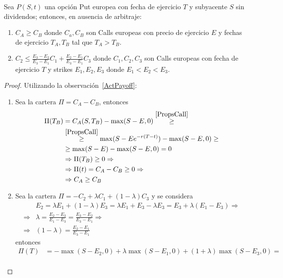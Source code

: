 \begin{proposition}
    Sea $P(S,t)$ una opción Put europea con fecha de ejercicio $T$ y subyacente $S$ sin dividendos; entonces, en ausencia de arbitraje:
    \begin{enumerate}
        \item $\boxed{C_A \geq C_B}$ donde $C_a, C_B$ son Calls europeas con precio de ejercicio $E$ y fechas de ejercicio $T_A, T_B$ tal que $T_A > T_B$.
        \item $\boxed{C_2 \leq \frac{E_3-E_2}{E_3-E_1}C_1 + \frac{E_2-E_1}{E_3-E_1}C_3}$ donde $C_1, C_2, C_3$ son Calls europeas con fecha de ejercicio $T$ y strikes $E_1, E_2, E_3$ donde $E_1<E_2<E_3$.
    \end{enumerate}
\end{proposition}
\begin{proof}
    Utilizando la observación~\ref{ActPayoff}:
    \begin{enumerate}
        \item Sea la cartera $\Pi = C_A-C_B$, entonces
        \begin{align*}
            \Pi(T_B) &= C_A(S,T_B) - \max(S-E,0) \overset{\ref{PropsCall}}{\geq} \\
            &\overset{\ref{PropsCall}}{\geq} \max(S-Ee^{-r(T-t)}) - \max(S-E,0) \geq \\
            &\geq \max(S-E) - \max(S-E,0) = 0 \\
            &\Rightarrow \Pi(T_B) \geq 0 \Rightarrow \\
            &\Rightarrow \Pi(t) = C_A-C_B \geq 0 \Rightarrow \\
            &\Rightarrow C_A \geq C_B
        \end{align*}
        \item Sea la cartera $\Pi = - C_2 + \lambda C_1 + (1-\lambda) C_3 $ y se considera 
        \begin{align*}
            &E_2 = \lambda E_1 + (1-\lambda) E_3 = \lambda E_1 + E_3-\lambda E_3 = E_3 + \lambda(E_1-E_3) \Rightarrow \\
            \Rightarrow &\lambda = \frac{E_2-E_3}{E_1-E_3} = \frac{E_3-E_2}{E_3-E_1} \Rightarrow \\
            \Rightarrow &(1-\lambda) = \frac{E_2-E_1}{E_3-E_1}
        \end{align*}
        entonces
        \begin{align*}
            \Pi(T) &= -\max(S-E_2, 0) + \lambda\max(S-E_1,0) + (1+\lambda)\max(S-E_3, 0) = \\

\end{align*}
\end{enumerate}
\end{proof}

